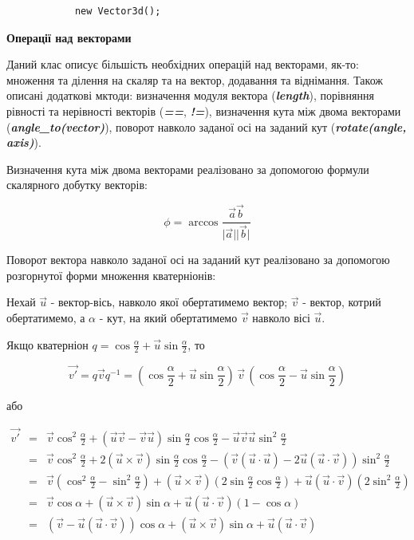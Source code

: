 \documentclass[simple,a4paper,14pt,ukrainian,utf8]{eskdtext}
\newcommand{\abs}[1]{\lvert#1\rvert} %
\begin{document}
            \begin{lstlisting}
            new Vector3d(); 
            \end{lstlisting}

            \textbf{Операції над векторами}

            Даний клас описує більшість необхідних операцій над векторами, як-то: множення та ділення на скаляр та на вектор, додавання та віднімання. Також описані додаткові мктоди: визначення модуля вектора (\textit{\textbf{length}}), порівняння рівності та нерівності векторів (\textit{\textbf{==}}, \textit{\textbf{!=}}), визначення кута між двома векторами (\textit{\textbf{angle\_to(vector)}}), поворот навколо заданої осі на заданий кут (\textit{\textbf{rotate(angle, axis)}}).

            Визначення кута між двома векторами реалізовано за допомогою формули скалярного добутку векторів:

            $$ \phi = \arccos \frac{\vec{a}\vec{b}}{\abs{\vec{a}}\abs{\vec{b}}} $$

            Поворот вектора навколо заданої осі на заданий кут реалізовано за допомогою розгорнутої форми множення кватерніонів:


            Нехай $\vec{u}$ - вектор-вісь, навколо якої обертатимемо вектор; $\vec{v}$ - вектор, котрий обертатимемо, а $\alpha$ - кут, на який обертатимемо $\vec{v}$ навколо вісі $\vec{u}$.

            Якщо кватерніон $ q = \cos \frac{\alpha}{2} + \vec{u} \sin \frac{\alpha}{2} $, то

            $$ \vec{v'} = q \vec{v} q^{-1} = \left( \cos \frac{\alpha}{2} + \vec{u} \sin \frac{\alpha}{2} \right) \, \vec{v} \, \left( \cos \frac{\alpha}{2} - \vec{u} \sin \frac{\alpha}{2} \right) $$

            або

            \begin{displaymath}
                \begin{array}{lll}
                    \vec{v'} &=& \vec{v} \cos^2 \frac{\alpha}{2} + (\vec{u}\vec{v} - \vec{v}\vec{u}) \sin \frac{\alpha}{2} \cos \frac{\alpha}{2} - \vec{u}\vec{v}\vec{u} \sin^2 \frac{\alpha}{2} \\
                    &=& \vec{v} \cos^2 \frac{\alpha}{2} + 2 (\vec{u} \times \vec{v}) \sin \frac{\alpha}{2} \cos \frac{\alpha}{2} - (\vec{v} (\vec{u} \cdot \vec{u}) - 2 \vec{u} (\vec{u} \cdot \vec{v})) \sin^2 \frac{\alpha}{2} \\
                    &=& \vec{v} (\cos^2 \frac{\alpha}{2} - \sin^2 \frac{\alpha}{2}) + (\vec{u} \times \vec{v}) (2 \sin \frac{\alpha}{2} \cos \frac{\alpha}{2}) + \vec{u} (\vec{u} \cdot \vec{v}) (2 \sin^2 \frac{\alpha}{2}) \\
                    &=& \vec{v} \cos \alpha + (\vec{u} \times \vec{v}) \sin \alpha + \vec{u} (\vec{u} \cdot \vec{v}) (1 - \cos \alpha) \\
                    &=& (\vec{v} - \vec{u} (\vec{u} \cdot \vec{v})) \cos \alpha + (\vec{u} \times \vec{v}) \sin \alpha + \vec{u} (\vec{u} \cdot \vec{v})
                \end{array}
            \end{displaymath}
\end{document}
